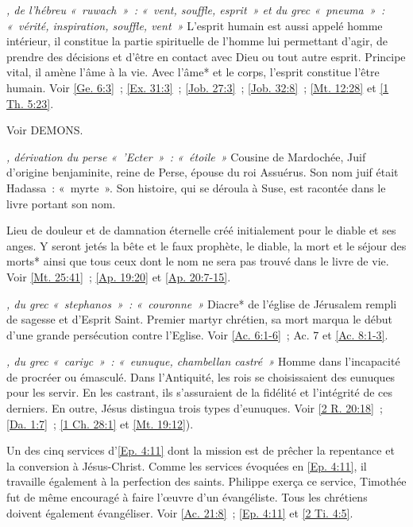 \begin{multicols}{2}
\textit{, de l'hébreu «~ruwach~»~: «~vent, souffle, esprit~» et du grec «~pneuma~»~: «~vérité, inspiration, souffle, vent~»}\newline
L'esprit humain est aussi appelé homme intérieur, il constitue la partie spirituelle de l'homme lui permettant d'agir, de prendre des décisions et d'être en contact avec Dieu ou tout autre esprit. Principe vital, il amène l'âme à la vie. Avec l'âme* et le corps, l'esprit constitue l'être humain. Voir \vref{Ge. 6:3}~; \vref{Ex. 31:3}~; \vref{Job. 27:3}~; \vref{Job. 32:8}~; \vref{Mt. 12:28} et \vref{1 Th. 5:23}.

\textit{}\newline
Voir DEMONS.

\textit{, dérivation du perse «~'Ecter~»~: «~étoile~»}\newline
Cousine de Mardochée, Juif d'origine benjaminite, reine de Perse, épouse du roi Assuérus. Son nom juif était Hadassa~: «~myrte~». Son histoire, qui se déroula à Suse, est racontée dans le livre portant son nom.

\textit{}\newline
Lieu de douleur et de damnation éternelle créé initialement pour le diable et ses anges. Y seront jetés la bête et le faux prophète, le diable, la mort et le séjour des morts* ainsi que tous ceux dont le nom ne sera pas trouvé dans le livre de vie. Voir \vref{Mt. 25:41}~; \vref{Ap. 19:20} et \vref{Ap. 20:7-15}.

\textit{, du grec «~stephanos~»~: «~couronne~»}\newline
Diacre* de l'église de Jérusalem rempli de sagesse et d'Esprit Saint. Premier martyr chrétien, sa mort marqua le début d'une grande persécution contre l'Eglise. Voir \vref{Ac. 6:1-6}~; Ac. 7 et \vref{Ac. 8:1-3}.

\textit{, du grec «~cariyc~»~: «~eunuque, chambellan castré~»}\newline
Homme dans l'incapacité de procréer ou émasculé. Dans l'Antiquité, les rois se choisissaient des eunuques pour les servir. En les castrant, ils s'assuraient de la fidélité et l'intégrité de ces derniers. En outre, Jésus distingua trois types d'eunuques. Voir \vref{2 R. 20:18}~; \vref{Da. 1:7}~; \vref{1 Ch. 28:1} et \vref{Mt. 19:12}).

\textit{}\newline
Un des cinq services d'\vref{Ep. 4:11} dont la mission est de prêcher la repentance et la conversion à Jésus-Christ. Comme les services évoquées en \vref{Ep. 4:11}, il travaille également à la perfection des saints. Philippe exerça ce service, Timothée fut de même encouragé à faire l'œuvre d'un évangéliste. Tous les chrétiens doivent également évangéliser. Voir \vref{Ac. 21:8}~; \vref{Ep. 4:11} et \vref{2 Ti. 4:5}.


\end{multicols}
